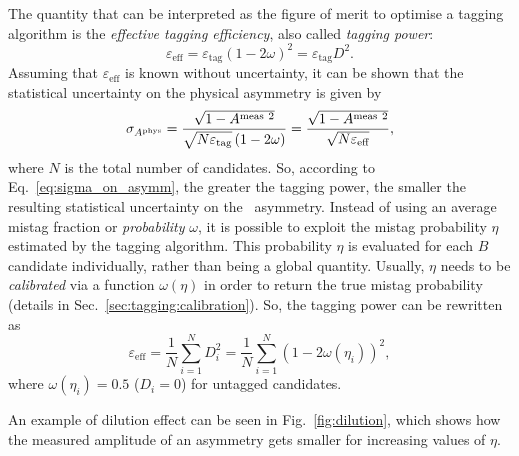 The quantity that can be interpreted as the figure of merit to
optimise a tagging algorithm is the
\emph{effective tagging efficiency}, also called \emph{tagging power}:
\begin{equation}
	\varepsilon_\text{eff}=\varepsilon_\text{tag}\left(1-2\omega\right)^2=\varepsilon_\text{tag}D^2.
\end{equation}
Assuming that $\varepsilon_\text{eff}$ is known without uncertainty, it can be shown that the statistical uncertainty on the physical asymmetry is given by
\begin{equation}
	\label{eq:sigma_on_asymm}
	\sigma_{A^{\rm phys}} = \frac{\sqrt{1-A^{\rm meas~2}}}{\sqrt{N\varepsilon_\text{tag}}\left(1-2\omega\right)}=\frac{\sqrt{1-A^{\rm meas~2}}}{\sqrt{N\varepsilon_\text{eff}}},
\end{equation}
where $N$ is the total number of candidates. So, according to Eq.~\ref{eq:sigma_on_asymm}, the greater the tagging power, the smaller the resulting statistical uncertainty on the \CP~asymmetry. 
Instead of using an average mistag fraction or \emph{probability} $\omega$, it is possible to exploit the
mistag probability $\eta$ estimated by the tagging algorithm. This probability $\eta$ is evaluated for each $B$ candidate individually, rather
than being a global quantity. Usually, $\eta$ needs to be \emph{calibrated} via a function $\omega(\eta)$ in order to return the true mistag probability (details in Sec.~\ref{sec:tagging:calibration}).
So, the tagging power can be rewritten as
\begin{equation}
	\label{eq:perevent_tagpower}
	\varepsilon_\text{eff} = \frac{1}{N}\sum_{i=1}^{N}D_i^2 = \frac{1}{N}\sum_{i=1}^{N}\left(1-2\omega(\eta_i)\right)^2,
\end{equation}
where $\omega(\eta_i)=0.5$ ($D_i=0$) for untagged candidates.

An example of dilution effect can be seen in Fig.~\ref{fig:dilution}, which shows how the measured amplitude of an asymmetry gets smaller for increasing values of $\eta$.

